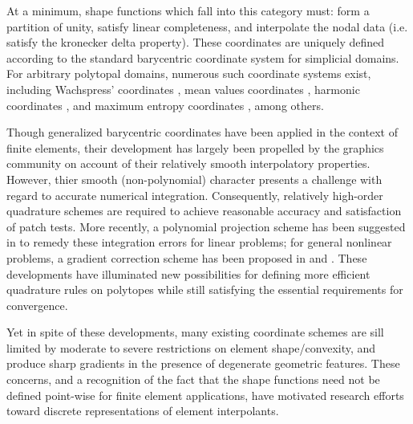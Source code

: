 		At a minimum, shape functions which fall into this category must: form a partition of unity, satisfy linear completeness, and interpolate the nodal data (i.e. satisfy the kronecker delta property). These coordinates are uniquely defined according to the standard barycentric coordinate system for simplicial domains. For arbitrary polytopal domains, numerous such coordinate systems exist, including Wachspress' coordinates \cite{Wachspress:75}, mean values coordinates \cite{Floater:03}, harmonic coordinates \cite{Joshi:07}, and maximum entropy coordinates \cite{Sukumar:04}, among others.
			
		Though generalized barycentric coordinates have been applied in the context of finite elements, their development has largely been propelled by the graphics community on account of their relatively smooth interpolatory properties. However, thier smooth (non-polynomial) character presents a challenge with regard to accurate numerical integration. Consequently, relatively high-order quadrature schemes are required to achieve reasonable accuracy and satisfaction of patch tests. More recently, a polynomial projection scheme has been suggested in \cite{Talischi:14} to remedy these integration errors for linear problems; for general nonlinear problems, a gradient correction scheme has been proposed in \cite{Talischi:15} and \cite{Chi:16}. These developments have illuminated new possibilities for defining more efficient quadrature rules on polytopes while still satisfying the essential requirements for convergence.
		
		Yet in spite of these developments, many existing coordinate schemes are sill limited by moderate to severe restrictions on element shape/convexity, and produce sharp gradients in the presence of degenerate geometric features. These concerns, and a recognition of the fact that the shape functions need not be defined point-wise for finite element applications, have motivated research efforts toward discrete representations of element interpolants.

